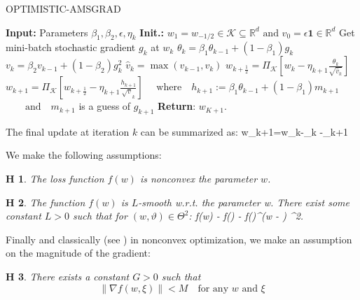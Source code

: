 \documentclass[11pt]{article}
\newtheorem{assumption}{H\!\!}
\theoremstyle{k}
\begin{document}
\begin{algorithm}[H]
\caption{OPTIMISTIC-AMSGRAD}\label{alg:opt-ams}
  \begin{algorithmic}[1]
  \STATE \textbf{Input:} Parameters $\beta_{1}, \beta_{2}, \epsilon, \eta_{k}$
  \STATE \textbf{Init.:} $w_{1}=w_{-1 / 2} \in \mathcal{K} \subseteq \mathbb{R}^{d} \text { and } v_{0}=\epsilon \mathbf{1} \in \mathbb{R}^{d}$
  \STATE Get mini-batch stochastic gradient $g_{k}$ at $w_{k}$
   \STATE $\theta_{k}=\beta_{1} \theta_{k-1}+\left(1-\beta_{1}\right) g_{k}$
   \STATE $v_{k}=\beta_{2} v_{k-1}+\left(1-\beta_{2}\right) g_{k}^{2}$
   \STATE $ \hat{v}_{k}=\max \left(\hat{v}_{k-1}, v_{k}\right)$
   \STATE $ w_{k+\frac{1}{2}}=\Pi_{\mathcal{K}}\left[w_k-\eta_{k+1} \frac{\theta_{k}}{\sqrt{\hat{v}_{k}}}\right]$
   \STATE $ w_{k+1}=\Pi_{\mathcal{K}}\left[w_{k+\frac{1}{2}}-\eta_{k+1} \frac{h_{k+1}}{\sqrt{v}_{k}}\right]$
   \STATE $ \quad \text{where} \quad h_{k+1}:=\beta_{1} \theta_{k-1} + (1-\beta_{1}) m_{k+1}$
      \STATE $ \quad\quad \text{and} \quad m_{k+1}$ is a guess of $g_{k+1}$
\ENDFOR
\STATE \textbf{Return}: $w_{K+1}$.
  \end{algorithmic}
\end{algorithm}\vspace{.1cm}
The final update at iteration $k$ can be summarized as:
\beq\label{eq:finalupdate}
w_{k+1}=w_{k}-\eta_{k} -\eta_{k+1} 
\eeq



We make the following assumptions:
\begin{assumption}\label{ass:nonconv}
The loss function $f(w)$ is nonconvex \wrt the parameter $w$.
\end{assumption}
\begin{assumption}\label{ass:smooth}
The function $f(w)$ is $L$-smooth w.r.t. the parameter w.
There exist some constant $L > 0$ such that for $(w, \vartheta) \in \Theta^2$:
\beq
f(w) - f(\vartheta) - \nabla f(\vartheta)^\top(w - \vartheta) \leq {} ^2\eqsp.
\eeq
\end{assumption}
Finally and classically (see \citep{ghadimi2013stochastic}) in nonconvex optimization, we make an assumption on the magnitude of the gradient:
\begin{assumption}\label{ass:bounded}
There exists a constant $G >0$ such that 
$$
\|\nabla f(w, \xi)\| < M \quad \textrm{for any $w$ and $\xi$}
$$
\end{assumption}
\end{document}
